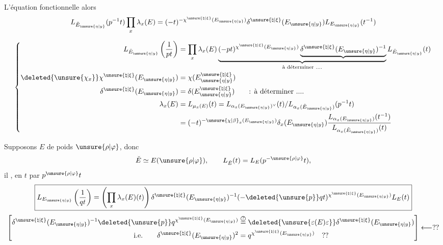 L'équation fonctionnelle  alors
\[
L_{\check E_{\unsure{\eta|y}}}(p^{-1}t)\prod_x\lambda_x(E)=(-t)^{-\chi^{\unsure{\natural|\xi}}(E_{\unsure{\eta|y}})}\delta^{\unsure{\natural|\xi}}(E_{\unsure{\eta|y}})L_{E_{\unsure{\eta|y}}}(t^{-1})
\]

\[
\left\{\begin{aligned}
L_{\check E_{\unsure{\eta|y}}}\left(\frac1{pt}\right)&=\prod_x\lambda_x(E)\underbrace{(-pt)^{\chi^{\unsure{\natural|\xi}}(E_{\unsure{\eta|y}})}\underbrace{\delta^{\unsure{\natural|\xi}}(E_{\unsure{\eta|y}})^{-1}}}_{\text{à déterminer ....}}L_{\check E_{\unsure{\eta|y}}}(t)\\
\deleted{\unsure{\chi_x}}\chi^{\unsure{\natural|\xi}}(E_{\unsure{\eta|y}})&=\chi(E_{\unsure{\eta|y}}^{\unsure{\natural|\xi}})\\
\delta^{\unsure{\natural|\xi}}(E_{\unsure{\eta|y}})&=\delta(E_{\unsure{\eta|y}}^{\unsure{\natural|\xi}})\qquad\text{: à déterminer ....}\\
\lambda_x(E)&=L_{\mu_x(E)}(t)=L_{\alpha_x(E_{\unsure{\eta|y}})^\vee}(t)/L_{\alpha_x(\check E_{\unsure{\eta|y}})}(p^{-1}t)\\
&=(-t)^{-\unsure{\chi|\beta}_x(E_{\unsure{\eta|y}})}\delta_x(E_{\unsure{\eta|y}})\frac{L_{\alpha_x(E_{\unsure{\eta|y}})}(t^{-1})}{L_{\alpha_x(\check E_{\unsure{\eta|y}})}(t)}
\end{aligned}\right.
\]

Supposons $E$ de poids $\unsure{\rho|\varphi}$, donc
\[
\check E\simeq E(\unsure{\rho|\varphi}),\qquad L_{\check E}(t)=L_E(p^{-\unsure{\rho|\varphi}}t),
\]
il , en  $t$ par $p^{\unsure{\rho|\varphi}}t$
\[
\boxed{L_{E_{\unsure{\eta|y}}}\left(\frac1{qt}\right)=\left(\prod_x\lambda_x(E)(t)\right)\delta^{\unsure{\natural|\xi}}(E_{\unsure{\eta|y}})^{-1}(-\deleted{\unsure{p}}qt)^{\chi^{\unsure{\natural|\xi}}(E_{\unsure{\eta|y}})}L_E(t)}
\]
\[
\left[\begin{aligned}
\delta^{\unsure{\natural|\xi}}(E_{\unsure{\eta|y}})^{-1}\deleted{\unsure{p}}q^{\chi^{\unsure{\natural|\xi}}(E_{\unsure{\eta|y}})}&\overset{\text{\textcircled{?}}}{=}\deleted{\unsure{\varepsilon(E)\varepsilon}}\delta^{\unsure{\natural|\xi}}(E_{\unsure{\eta|y}})\\
\text{i.e.}\qquad \delta^{\unsure{\natural|\xi}}(E_{\unsure{\eta|y}})^2&=q^{\chi^{\unsure{\natural|\xi}}(E_{\unsure{\eta|y}})}\quad ??
\end{aligned}\right]\longleftarrow ??
\]

